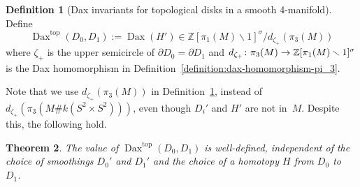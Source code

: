\documentclass[11pt]{amsart}
\def\to{\mathchoice{\longrightarrow}{\rightarrow}{\rightarrow}{\rightarrow}}
\newtheorem{theorem}{Theorem}[section]
\theoremstyle{definition}
\newtheorem{definition}[theorem]{Definition}
\theoremstyle{theorem-giventitle}
\theoremstyle{definition-giventitle}
\numberwithin{equation}{section}
\def\Z{\mathbb{Z}}
\def\top{\mathrm{top}}
\def\Dax{\operatorname{Dax}}
\def\setminus{\smallsetminus}
\begin{document}
\begin{definition}[Dax invariants for topological disks in a smooth 4-manifold]
  \label{definition:dax-top}
  Define
  \[
    \Dax^\top(D_0, D_1) := \Dax(H') \in \Z[\pi_1(M) \setminus 1]^\sigma / d_{\zeta_+}(\pi_3(M))
  \]
  where $\zeta_+$ is the upper semicircle of $\partial D_0 = \partial D_1$ and $d_{\zeta_+}\colon \pi_3(M) \to \Z[\pi_1(M) \setminus 1]^\sigma$ is the Dax homomorphism in Definition~\ref{definition:dax-homomorphism-pi_3}.
\end{definition}

Note that we use $d_{\zeta_+}(\pi_3(M))$ in Definition~\ref{definition:dax-top}, instead of $d_{\zeta_+}(\pi_3(M\# k(S^2\times S^2)))$, even though $D_i'$ and $H'$ are not in~$M$.
Despite this, the following hold.

\begin{theorem}
  \label{theorem:dax-top-well-defined}
  The value of $\Dax^\top(D_0, D_1)$ is well-defined, independent of the choice of smoothings $D_0'$ and $D_1'$ and the choice of a homotopy $H$ from $D_0$ to~$D_1$.
\end{theorem}
\end{document}
